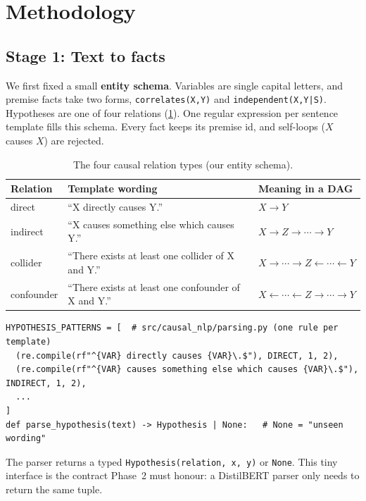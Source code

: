 \documentclass[12pt,a4paper]{article}
\newcommand{\thead}[1]{\textbf{#1}}
\newcommand{\code}[1]{\texttt{#1}}
\begin{document}
\section{Methodology}\label{sec:method}

\subsection{Stage 1: Text to facts}
We first fixed a small \textbf{entity schema}. Variables are single capital letters, and
premise facts take two forms, \code{correlates(X,Y)} and \code{independent(X,Y|S)}. Hypotheses are one of four relations
(\cref{tab:schema}). One regular expression per sentence template fills this schema. Every fact keeps
its premise id, and self-loops ($X$ causes $X$) are rejected.

\begin{table}[!htbp]
\centering\small
\caption{The four causal relation types (our entity schema).}
\label{tab:schema}
\begin{tabular}{@{}lll@{}}
\toprule
\thead{Relation} & \thead{Template wording} & \thead{Meaning in a DAG} \\
\midrule
direct     & ``X directly causes Y.'' & $X\rightarrow Y$ \\
\rowcolor{rowtint} indirect & ``X causes something else which causes Y.'' & $X\rightarrow Z\rightarrow\cdots\rightarrow Y$ \\
collider   & ``There exists at least one collider of X and Y.'' & $X\rightarrow\cdots\rightarrow Z\leftarrow\cdots\leftarrow Y$ \\
\rowcolor{rowtint} confounder & ``There exists at least one confounder of X and Y.'' & $X\leftarrow\cdots\leftarrow Z\rightarrow\cdots\rightarrow Y$ \\
\bottomrule
\end{tabular}
\end{table}

\begin{lstlisting}
HYPOTHESIS_PATTERNS = [  # src/causal_nlp/parsing.py (one rule per template)
  (re.compile(rf"^{VAR} directly causes {VAR}\.$"), DIRECT, 1, 2),
  (re.compile(rf"^{VAR} causes something else which causes {VAR}\.$"), INDIRECT, 1, 2),
  ...
]
def parse_hypothesis(text) -> Hypothesis | None:   # None = "unseen wording"
\end{lstlisting}

The parser returns a typed \code{Hypothesis(relation, x, y)} or \code{None}. This tiny interface is the
contract Phase~2 must honour: a DistilBERT parser only needs to return the same tuple.
\end{document}
